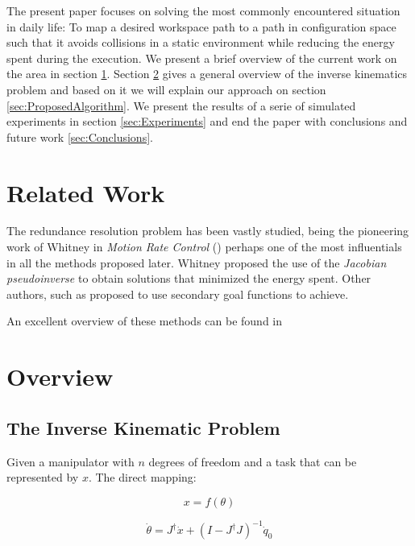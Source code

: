 \documentclass[conference]{IEEEtran}
\newcommand{\Jps}{ \ensuremath{J^{\dagger}} }
\newcommand{\dx}{ \ensuremath{\dot{x}} }
\newcommand{\dt}{ \ensuremath{\dot{\theta}} }
\begin{document}
The present paper focuses on solving the most commonly encountered
situation in daily life: To map a desired workspace path to a path in
configuration space such that it avoids collisions in a static
environment while reducing the energy spent during the execution. We
present a brief overview of the current work on the area in section 
\ref{sec:RelatedWork}. Section \ref{sec:Overview} gives a general overview of
the inverse kinematics problem and based on it we will explain our
approach on section \ref{sec:ProposedAlgorithm}. We present the 
results of a serie of simulated experiments in section \ref{sec:Experiments}
and end the paper with conclusions and future work \ref{sec:Conclusions}.


\section{Related Work}
\label{sec:RelatedWork}
The redundance resolution problem has been vastly studied, being the
pioneering work of Whitney in \emph{Motion Rate Control} (\cite{Whitney-motionRate-1969}) perhaps one of the most influentials in all the methods proposed later. 
Whitney proposed the use of the \emph{Jacobian pseudoinverse} to obtain
solutions that minimized the energy spent.  
Other authors, such as \cite{liegeois-ns-1977} proposed to use
secondary goal functions to achieve.

An excellent overview of these methods can be found in \cite{siciliano-ns-1990}

\section{Overview}
\label{sec:Overview}

\subsection{The Inverse Kinematic Problem}
Given a manipulator with $n$ degrees of freedom and a task that
can be represented by $x$. The direct mapping:

\begin{equation}
x = f(\theta) 
\label{eq:DK}
\end{equation}

\begin{equation}
\dt = \Jps \dx + (I - \Jps J)^{-1}\dot{q}_{0}
\label{eq:IK_MinNorm_Solution}
\end{equation}
\end{document}

